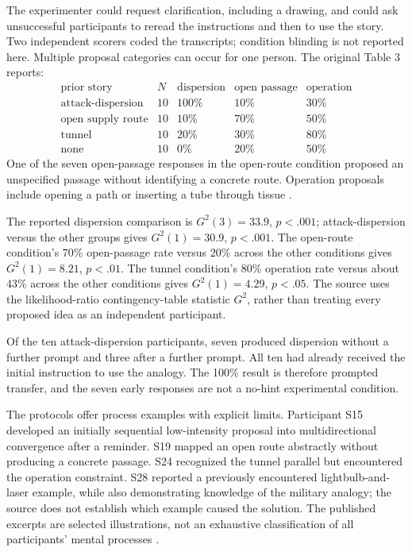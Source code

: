 The experimenter could request clarification, including a
drawing, and could ask unsuccessful participants to reread
the instructions and then to use the story. Two independent
scorers coded the transcripts; condition blinding is not
reported here. Multiple proposal categories can occur for
one person. The original Table 3 reports:
\[
\begin{array}{l|r|rrr}
 \text{prior story}&N&\text{dispersion}&\text{open passage}&\text{operation}\\ \hline
 \text{attack-dispersion}&10&100\%&10\%&30\%\\
 \text{open supply route}&10&10\%&70\%&50\%\\
 \text{tunnel}&10&20\%&30\%&80\%\\
 \text{none}&10&0\%&20\%&50\%
\end{array}
\]
One of the seven open-passage responses in the open-route
condition proposed an unspecified passage without identifying
a concrete route. Operation proposals include opening a path
or inserting a tube through tissue
\cite[pp.~319--321]{GickHolyoak1980AnalogicalProblemSolving}.

The reported dispersion comparison is \(G^2(3)=33.9\),
\(p<.001\); attack-dispersion versus the other groups gives
\(G^2(1)=30.9\), \(p<.001\). The open-route condition's
70\% open-passage rate versus 20\% across the other
conditions gives \(G^2(1)=8.21\), \(p<.01\).
The tunnel condition's 80\% operation rate versus about
43\% across the other conditions gives \(G^2(1)=4.29\),
\(p<.05\). The source uses the likelihood-ratio
contingency-table statistic \(G^2\), rather than treating
every proposed idea as an independent participant.

Of the ten attack-dispersion participants, seven produced
dispersion without a further prompt and three after a
further prompt. All ten had already received the initial
instruction to use the analogy. The 100\% result is
therefore prompted transfer, and the seven early responses
are not a no-hint experimental condition.

The protocols offer process examples with explicit limits.
Participant S15 developed an initially sequential
low-intensity proposal into multidirectional convergence
after a reminder. S19 mapped an open route abstractly
without producing a concrete passage. S24 recognized
the tunnel parallel but encountered the operation
constraint. S28 reported a previously encountered
lightbulb-and-laser example, while also demonstrating
knowledge of the military analogy; the source does
not establish which example caused the solution.
The published excerpts are selected illustrations,
not an exhaustive classification of all participants'
mental processes
\cite[pp.~325--331, tables~5--8]{GickHolyoak1980AnalogicalProblemSolving}.

